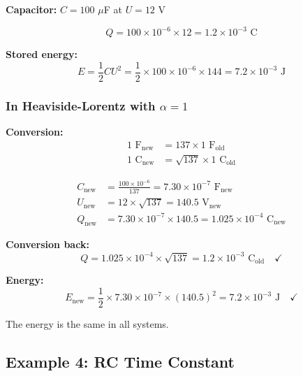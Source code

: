 	\textbf{Capacitor:} $C = 100$ $\mu$F at $U = 12$ V
	
	\begin{equation}
		Q = 100 \times 10^{-6} \times 12 = 1.2 \times 10^{-3} \text{ C}
	\end{equation}
	
	\textbf{Stored energy:}
	\begin{equation}
		E = \frac{1}{2} C U^2 = \frac{1}{2} \times 100 \times 10^{-6} \times 144 = 7.2 \times 10^{-3} \text{ J}
	\end{equation}
	
	\subsubsection{In Heaviside-Lorentz with $\alpha = 1$}
	
	\textbf{Conversion:}
	\begin{align}
		1 \text{ F}_{\text{new}} &= 137 \times 1 \text{ F}_{\text{old}} \\
		1 \text{ C}_{\text{new}} &= \sqrt{137} \times 1 \text{ C}_{\text{old}}
	\end{align}
	
	\begin{align}
		C_{\text{new}} &= \frac{100 \times 10^{-6}}{137} = 7.30 \times 10^{-7} \text{ F}_{\text{new}} \\
		U_{\text{new}} &= 12 \times \sqrt{137} = 140.5 \text{ V}_{\text{new}} \\
		Q_{\text{new}} &= 7.30 \times 10^{-7} \times 140.5 = 1.025 \times 10^{-4} \text{ C}_{\text{new}}
	\end{align}
	
	\textbf{Conversion back:}
	\begin{equation}
		Q = 1.025 \times 10^{-4} \times \sqrt{137} = 1.2 \times 10^{-3} \text{ C}_{\text{old}} \quad \checkmark
	\end{equation}
	
	\textbf{Energy:}
	\begin{equation}
		E_{\text{new}} = \frac{1}{2} \times 7.30 \times 10^{-7} \times (140.5)^2 = 7.2 \times 10^{-3} \text{ J} \quad \checkmark
	\end{equation}
	
	The energy is the same in all systems.
	
	\subsection{Example 4: RC Time Constant}
	
